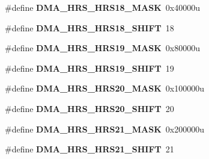 \begin{DoxyCompactItemize}
\item 
\hypertarget{group___d_m_a___register___masks_gae1b3296a48f5b7d2d4bddf30b5cdac39}{}\#define {\bfseries D\+M\+A\+\_\+\+H\+R\+S\+\_\+\+H\+R\+S18\+\_\+\+M\+A\+S\+K}~0x40000u\label{group___d_m_a___register___masks_gae1b3296a48f5b7d2d4bddf30b5cdac39}

\item 
\hypertarget{group___d_m_a___register___masks_gadbc7cce291f5addeccdbb3e6df7f9250}{}\#define {\bfseries D\+M\+A\+\_\+\+H\+R\+S\+\_\+\+H\+R\+S18\+\_\+\+S\+H\+I\+F\+T}~18\label{group___d_m_a___register___masks_gadbc7cce291f5addeccdbb3e6df7f9250}

\item 
\hypertarget{group___d_m_a___register___masks_ga8663fb02d97b7b2c9de106b3c5e051c5}{}\#define {\bfseries D\+M\+A\+\_\+\+H\+R\+S\+\_\+\+H\+R\+S19\+\_\+\+M\+A\+S\+K}~0x80000u\label{group___d_m_a___register___masks_ga8663fb02d97b7b2c9de106b3c5e051c5}

\item 
\hypertarget{group___d_m_a___register___masks_gaf06479e004dbdb6f58931c3105990fa9}{}\#define {\bfseries D\+M\+A\+\_\+\+H\+R\+S\+\_\+\+H\+R\+S19\+\_\+\+S\+H\+I\+F\+T}~19\label{group___d_m_a___register___masks_gaf06479e004dbdb6f58931c3105990fa9}

\item 
\hypertarget{group___d_m_a___register___masks_ga53a03b62b8cdb9d74565a6c3aa942155}{}\#define {\bfseries D\+M\+A\+\_\+\+H\+R\+S\+\_\+\+H\+R\+S20\+\_\+\+M\+A\+S\+K}~0x100000u\label{group___d_m_a___register___masks_ga53a03b62b8cdb9d74565a6c3aa942155}

\item 
\hypertarget{group___d_m_a___register___masks_ga63f2090b671245dc3ce8dd0ad88cd1f3}{}\#define {\bfseries D\+M\+A\+\_\+\+H\+R\+S\+\_\+\+H\+R\+S20\+\_\+\+S\+H\+I\+F\+T}~20\label{group___d_m_a___register___masks_ga63f2090b671245dc3ce8dd0ad88cd1f3}

\item 
\hypertarget{group___d_m_a___register___masks_gafb284cf07bee6d2e8c3ebddbd82916de}{}\#define {\bfseries D\+M\+A\+\_\+\+H\+R\+S\+\_\+\+H\+R\+S21\+\_\+\+M\+A\+S\+K}~0x200000u\label{group___d_m_a___register___masks_gafb284cf07bee6d2e8c3ebddbd82916de}

\item 
\hypertarget{group___d_m_a___register___masks_ga16cb9b1c728a945ce949ee45da9199fa}{}\#define {\bfseries D\+M\+A\+\_\+\+H\+R\+S\+\_\+\+H\+R\+S21\+\_\+\+S\+H\+I\+F\+T}~21\label{group___d_m_a___register___masks_ga16cb9b1c728a945ce949ee45da9199fa}


\end{DoxyCompactItemize}
